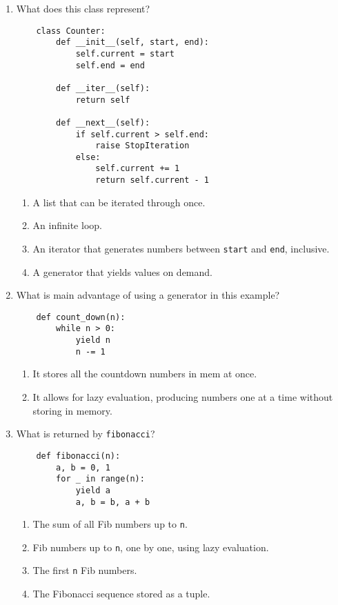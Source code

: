 \documentclass[oneside,11pt,dvipsnames]{book}
\begin{document}
\begin{enumerate}
\item What does this class represent?
\begin{lstlisting}
    class Counter:
        def __init__(self, start, end):
            self.current = start
            self.end = end
    
        def __iter__(self):
            return self
    
        def __next__(self):
            if self.current > self.end:
                raise StopIteration
            else:
                self.current += 1
                return self.current - 1
    \end{lstlisting}
\begin{enumerate}
    \item A list that can be iterated through once.
    \item An infinite loop.
    \item An iterator that generates numbers between \texttt{start} and \texttt{end}, inclusive.
    \item A generator that yields values on demand.
\end{enumerate}




\item What is main advantage of using a generator in this example?
\begin{lstlisting}
    def count_down(n):
        while n > 0:
            yield n
            n -= 1
    \end{lstlisting}

\begin{enumerate}
    \item It stores all the countdown numbers in mem at once.
    \item It allows for lazy evaluation, producing numbers one at a time without storing in memory.
\end{enumerate}


\item What is returned by \texttt{fibonacci}?

\begin{lstlisting}
    def fibonacci(n):
        a, b = 0, 1
        for _ in range(n):
            yield a
            a, b = b, a + b
\end{lstlisting}

\begin{enumerate}
    \item The sum of all Fib numbers up to \texttt{n}.
    \item Fib numbers up to \texttt{n}, one by one, using lazy evaluation.
    \item The first \texttt{n} Fib numbers.
    \item The Fibonacci sequence stored as a tuple.
\end{enumerate}


\end{enumerate}
\end{document}
